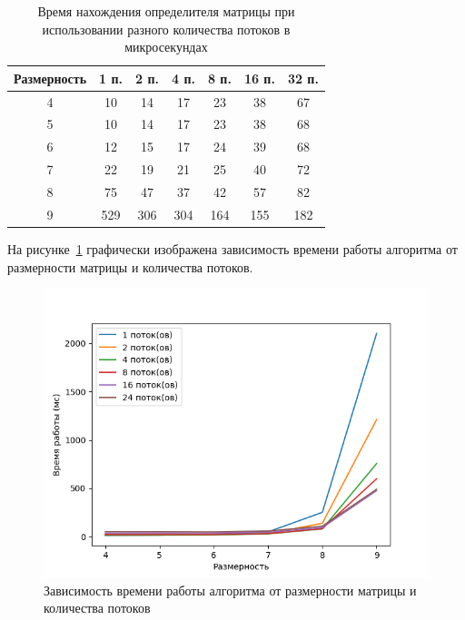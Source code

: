 \documentclass[12pt]{report}
\begin{document}
    \begin{table}[h]
        \begin{center}
            \captionsetup{justification=raggedright, singlelinecheck=false}
            \caption{\label{time} Время нахождения определителя матрицы при
            использовании разного количества потоков в микросекундах}
            \begin{tabular}{|c c c c c c c|}
                \hline
                Размерность & 1 п. & 2 п. & 4 п. & 8 п. & 16 п. & 32 п.
                \\
                \hline
                4 & 10  & 14  & 17  & 23  & 38  & 67  \\
                \hline
                5 & 10  & 14  & 17  & 23  & 38  & 68  \\
                \hline
                6 & 12  & 15  & 17  & 24  & 39  & 68  \\
                \hline
                7 & 22  & 19  & 21  & 25  & 40  & 72  \\
                \hline
                8 & 75  & 47  & 37  & 42  & 57  & 82  \\
                \hline
                9 & 529 & 306 & 304 & 164 & 155 & 182 \\
                \hline
            \end{tabular}
        \end{center}
    \end{table}

    На рисунке~\ref{img:graph} графически изображена зависимость
    времени работы алгоритма от размерности матрицы и количества потоков.

    \begin{figure}[H]
        \centering
        \includegraphics[width=0.8\linewidth]{img/graph}
        \caption{
            Зависимость времени работы алгоритма от размерности матрицы и количества потоков
        }
        \label{img:graph}
    \end{figure}
\end{document}
